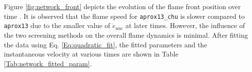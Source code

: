 \documentclass[preprint,times,tighten,linenumbers,trackchanges]{aastex631}
\begin{document}



Figure \ref{fig:network_front} depicts the evolution of the flame front position over time . It is observed that the flame speed for {\tt aprox13\_chu} is slower compared to {\tt aprox13} due to the smaller value of $\dot{e}_{\textrm{nuc}}$ at later times. However, the influence of the two screening methods on the overall flame dynamics is minimal. After fitting the data using Eq. \ref{Eq:quadratic_fit}, the fitted parameters and the instantaneous velocity at various times are shown in Table \ref{Tab:network_fitted_param}. 


\end{document}

